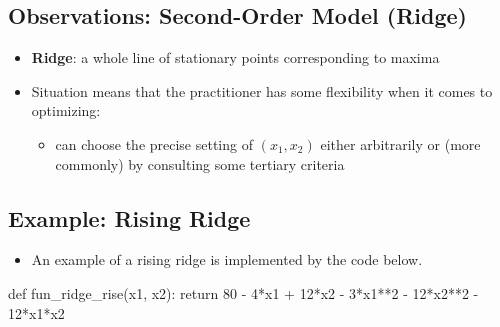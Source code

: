 \documentclass[
  letterpaper,
  DIV=11,
  numbers=noendperiod]{scrreprt}
\newenvironment{Shaded}{\begin{snugshade}}{\end{snugshade}}
\newcommand{\ControlFlowTok}[1]{\textcolor[rgb]{0.00,0.23,0.31}{#1}}
\newcommand{\DecValTok}[1]{\textcolor[rgb]{0.68,0.00,0.00}{#1}}
\newcommand{\KeywordTok}[1]{\textcolor[rgb]{0.00,0.23,0.31}{#1}}
\newcommand{\NormalTok}[1]{\textcolor[rgb]{0.00,0.23,0.31}{#1}}
\newcommand{\OperatorTok}[1]{\textcolor[rgb]{0.37,0.37,0.37}{#1}}
\providecommand{\tightlist}{%
  \setlength{\itemsep}{0pt}\setlength{\parskip}{0pt}}\usepackage{longtable,booktabs,array}
\begin{document}
\hypertarget{observations-second-order-model-ridge}{%
\subsection{Observations: Second-Order Model
(Ridge)}\label{observations-second-order-model-ridge}}

\begin{itemize}
\tightlist
\item
  \textbf{Ridge}: a whole line of stationary points corresponding to
  maxima
\item
  Situation means that the practitioner has some flexibility when it
  comes to optimizing:

  \begin{itemize}
  \tightlist
  \item
    can choose the precise setting of \((x_1, x_2)\) either arbitrarily
    or (more commonly) by consulting some tertiary criteria
  \end{itemize}
\end{itemize}

\hypertarget{example-rising-ridge}{%
\subsection{Example: Rising Ridge}\label{example-rising-ridge}}

\begin{itemize}
\tightlist
\item
  An example of a rising ridge is implemented by the code below.
\end{itemize}

\begin{Shaded}
\begin{Highlighting}[]
\KeywordTok{def}\NormalTok{ fun\_ridge\_rise(x1, x2):}
     \ControlFlowTok{return} \DecValTok{80} \OperatorTok{{-}} \DecValTok{4}\OperatorTok{*}\NormalTok{x1 }\OperatorTok{+} \DecValTok{12}\OperatorTok{*}\NormalTok{x2 }\OperatorTok{{-}} \DecValTok{3}\OperatorTok{*}\NormalTok{x1}\OperatorTok{**}\DecValTok{2} \OperatorTok{{-}} \DecValTok{12}\OperatorTok{*}\NormalTok{x2}\OperatorTok{**}\DecValTok{2} \OperatorTok{{-}} \DecValTok{12}\OperatorTok{*}\NormalTok{x1}\OperatorTok{*}\NormalTok{x2}
\end{Highlighting}
\end{Shaded}
\end{document}
